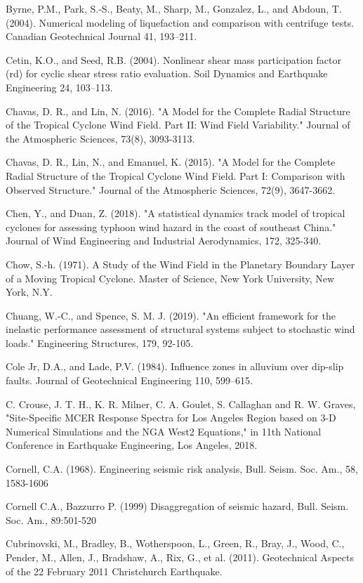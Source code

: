 Byrne, P.M., Park, S.-S., Beaty, M., Sharp, M., Gonzalez, L., and Abdoun, T. (2004). Numerical modeling of liquefaction and comparison with centrifuge tests. Canadian Geotechnical Journal 41, 193–211.

Cetin, K.O., and Seed, R.B. (2004). Nonlinear shear mass participation factor (rd) for cyclic shear stress ratio evaluation. Soil Dynamics and Earthquake Engineering 24, 103–113.

Chavas, D. R., and Lin, N. (2016). "A Model for the Complete Radial Structure of the Tropical Cyclone Wind Field. Part II: Wind Field Variability." Journal of the Atmospheric Sciences, 73(8), 3093-3113.

Chavas, D. R., Lin, N., and Emanuel, K. (2015). "A Model for the Complete Radial Structure of the Tropical Cyclone Wind Field. Part I: Comparison with Observed Structure." Journal of the Atmospheric Sciences, 72(9), 3647-3662.

Chen, Y., and Duan, Z. (2018). "A statistical dynamics track model of tropical cyclones for assessing typhoon wind hazard in the coast of southeast China." Journal of Wind Engineering and Industrial Aerodynamics, 172, 325-340.

Chow, S.-h. (1971). A Study of the Wind Field in the Planetary Boundary Layer of a Moving Tropical Cyclone. Master of Science, New York University, New York, N.Y.

Chuang, W.-C., and Spence, S. M. J. (2019). "An efficient framework for the inelastic performance assessment of structural systems subject to stochastic wind loads." Engineering Structures, 179, 92-105.

Cole Jr, D.A., and Lade, P.V. (1984). Influence zones in alluvium over dip-slip faults. Journal of Geotechnical Engineering 110, 599–615.

C. Crouse, J. T. H., K. R. Milner, C. A. Goulet, S. Callaghan and R. W. Graves, "Site-Specific MCER Response Spectra for Los Angeles Region based on 3-D Numerical Simulations and the NGA West2 Equations," in 11th National Conference in Earthquake Engineering, Los Angeles, 2018.

Cornell, C.A. (1968). Engineering seismic risk analysis, Bull. Seism. Soc. Am., 58, 1583-1606

Cornell C.A., Bazzurro P. (1999) Disaggregation of seismic hazard, Bull. Seism. Soc. Am., 89:501-520

Cubrinovski, M., Bradley, B., Wotherspoon, L., Green, R., Bray, J., Wood, C., Pender, M., Allen, J., Bradshaw, A., Rix, G., et al. (2011). Geotechnical Aspects of the 22 February 2011 Christchurch Earthquake.

